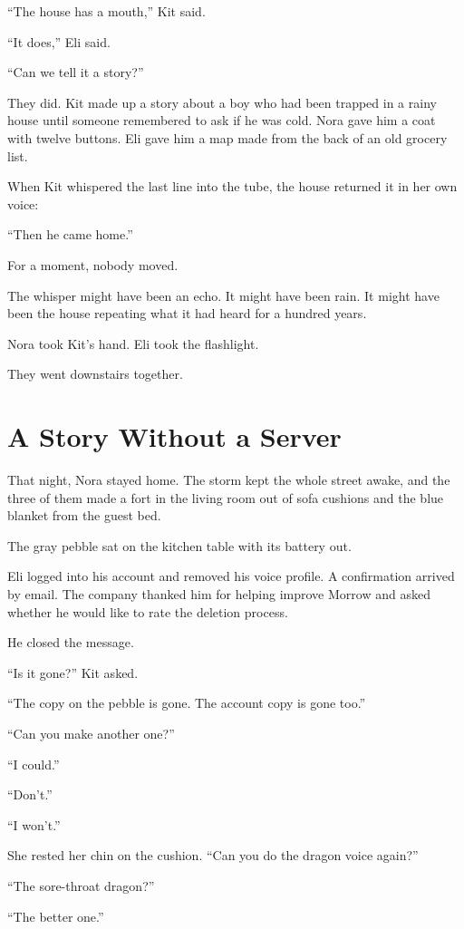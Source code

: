 \documentclass[11pt,openany]{book}
\begin{document}
``The house has a mouth,'' Kit said.

``It does,'' Eli said.

``Can we tell it a story?''

They did. Kit made up a story about a boy who had been trapped in a rainy house until someone remembered to ask if he was cold. Nora gave him a coat with twelve buttons. Eli gave him a map made from the back of an old grocery list.

When Kit whispered the last line into the tube, the house returned it in her own voice:

``Then he came home.''

For a moment, nobody moved.

The whisper might have been an echo. It might have been rain. It might have been the house repeating what it had heard for a hundred years.

Nora took Kit's hand. Eli took the flashlight.

They went downstairs together.

\chapter{A Story Without a Server}

That night, Nora stayed home. The storm kept the whole street awake, and the three of them made a fort in the living room out of sofa cushions and the blue blanket from the guest bed.

The gray pebble sat on the kitchen table with its battery out.

Eli logged into his account and removed his voice profile. A confirmation arrived by email. The company thanked him for helping improve Morrow and asked whether he would like to rate the deletion process.

He closed the message.

``Is it gone?'' Kit asked.

``The copy on the pebble is gone. The account copy is gone too.''

``Can you make another one?''

``I could.''

``Don't.''

``I won't.''

She rested her chin on the cushion. ``Can you do the dragon voice again?''

``The sore-throat dragon?''

``The better one.''
\end{document}
